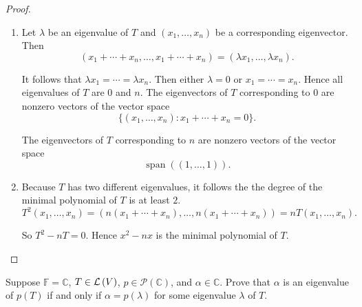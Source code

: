 \begin{proof}
    \begin{enumerate}[label={(\alph*)}]
        \item Let $\lambda$ be an eigenvalue of $T$ and $(x_{1}, \ldots, x_{n})$ be a corresponding eigenvector. Then
              \[
                  (x_{1} + \cdots + x_{n}, \ldots, x_{1} + \cdots + x_{n}) = (\lambda x_{1}, \ldots, \lambda x_{n}).
              \]

              It follows that $\lambda x_{1} = \cdots = \lambda x_{n}$. Then either $\lambda = 0$ or $x_{1} = \cdots = x_{n}$. Hence all eigenvalues of $T$ are $0$ and $n$. The eigenvectors of $T$ corresponding to $0$ are nonzero vectors of the vector space
              \[
                  \{ (x_{1}, \ldots, x_{n}): x_{1} + \cdots + x_{n} = 0 \}.
              \]

              The eigenvectors of $T$ corresponding to $n$ are nonzero vectors of the vector space
              \[
                  \operatorname{span}((1, \ldots, 1)).
              \]
        \item Because $T$ has two different eigenvalues, it follows the the degree of the minimal polynomial of $T$ is at least $2$.
              \[
                  T^{2}(x_{1}, \ldots, x_{n}) = (n(x_{1} + \cdots + x_{n}), \ldots, n(x_{1} + \cdots + x_{n})) = nT(x_{1}, \ldots, x_{n}).
              \]

              So $T^{2} - nT = 0$. Hence $x^{2} - nx$ is the minimal polynomial of $T$.
    \end{enumerate}
\end{proof}
\newpage

\begin{exercise}\label{chapter5:sectionB:exercise4}
    Suppose $\mathbb{F} = \mathbb{C}$, $T\in\mathcal{L}\left({V}\right)$, $p\in\mathscr{P}(\mathbb{C})$, and $\alpha\in\mathbb{C}$. Prove that $\alpha$ is an eigenvalue of $p(T)$ if and only if $\alpha = p(\lambda)$ for some eigenvalue $\lambda$ of $T$.
\end{exercise}

